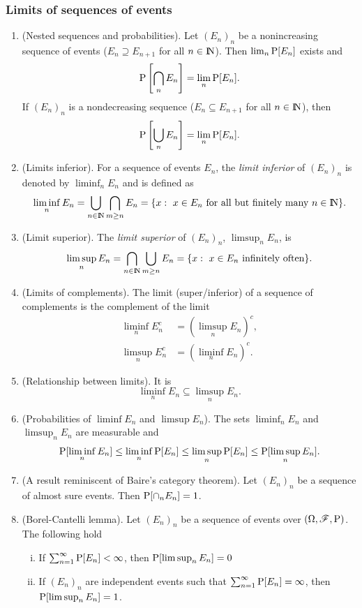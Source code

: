 \documentclass[a4paper,10pt]{article}
\begin{document}
\subsubsection{Limits of sequences of events}
\begin{enumerate}
 \item (Nested sequences and probabilities). Let $(E_n)_n$ be a nonincreasing sequence of events ($E_n\supseteq E_{n+1}$ for all $n\in\N$). 
       Then $\lim_n \mathrm{P}[E_n]$ exists and 
       \[
        \mathrm{P}\left[\bigcap_n E_n\right] = \lim_n \mathrm{P}[E_n].
       \]
       If $(E_n)_n$ is a nondecreasing sequence ($E_n \subseteq E_{n+1}$ for all $n\in\N$), then
       \[
        \mathrm{P}\left[\bigcup_n E_n\right] = \lim_n \mathrm{P}[E_n].
       \]


 \item (Limits inferior). For a sequence of events $E_n$, the \textit{limit inferior} of $(E_n)_n$
       is denoted by $\liminf_n E_n$ and is defined as 
       \[
        \liminf_n E_n = \bigcup_{n\in \N}\bigcap_{m\geq n}E_n = \{x:\ x\in E_n\ \text{for all but finitely many } n\in \N\}.
       \]
 \item (Limit superior). The \textit{limit superior} of $(E_n)_n$, $\limsup_n E_n$, is
       \[
        \limsup_n E_n = \bigcap_{n\in \N}\bigcup_{m\geq n}E_n = \{x:\ x\in E_n\ \text{infinitely often} \}.
       \]
 \item (Limits of complements). The limit (super/inferior) of a sequence of complements is the complement of the limit
	\begin{align*}
	 \liminf_n E_n^c &= (\limsup_n E_n)^c,\\
	 \limsup_n E_n^c &= (\liminf_n E_n)^c.
	\end{align*}

 \item (Relationship between limits). It is
       \[
        \liminf_n E_n \subseteq \limsup_n E_n.
       \]
 \item (Probabilities of $\liminf E_n$ and $\limsup E_n$). The sets $\liminf_n E_n$ and $\limsup_n E_n$ are measurable and 
 \[
  \mathrm{P}[\liminf_n E_n] \leq \liminf_n \mathrm{P}[E_n] \leq \limsup_n \mathrm{P}[E_n] \leq \mathrm{P}[\limsup_n E_n].
 \]
 
 \item (A result reminiscent of Baire's category theorem). Let $(E_n)_n$ be a sequence of almost sure events. Then
       $\mathrm{P}[\cap_n E_n] = 1$.

 \item (Borel-Cantelli lemma). Let $(E_n)_n$ be a sequence of events over $(\Omega,\mathscr{F},\mathrm{P})$. The following hold
 \begin{enumerate}[i.]
  \item If $\sum_{n=1}^{\infty}\mathrm{P}[E_n]<\infty$, then $\mathrm{P}[\limsup_n E_n] = 0$
  \item If $(E_n)_n$ are independent events such that $\sum_{n=1}^{\infty}\mathrm{P}[E_n]=\infty$, then
        $\mathrm{P}[\limsup_n E_n] = 1$.
 \end{enumerate}
 

\end{enumerate}
\end{document}
